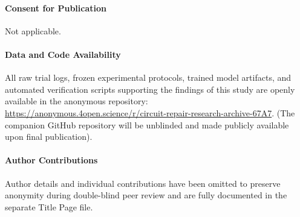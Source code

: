 \documentclass[11pt,a4paper]{article}
\begin{document}
\paragraph{Consent for Publication}
Not applicable.

\paragraph{Data and Code Availability}
All raw trial logs, frozen experimental protocols, trained model artifacts, and automated verification scripts supporting the findings of this study are openly available in the anonymous repository: \url{https://anonymous.4open.science/r/circuit-repair-research-archive-67A7}. (The companion GitHub repository will be unblinded and made publicly available upon final publication).

\paragraph{Author Contributions}
Author details and individual contributions have been omitted to preserve anonymity during double-blind peer review and are fully documented in the separate Title Page file.



\end{document}
